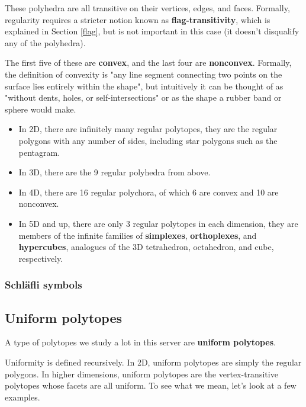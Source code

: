 \documentclass{article}
\begin{document}
These polyhedra are all transitive on their vertices, edges, and faces. Formally, regularity
requires a stricter notion known as \textbf{flag-transitivity}, which is explained in Section \ref{flag},
but is not important in this case (it doesn't disqualify any of the polyhedra).

The first five of these are \textbf{convex}, and the last four are \textbf{nonconvex}. Formally,
the definition of convexity is "any line segment connecting two points on the surface lies entirely
within the shape", but intuitively it can be thought of as "without dents, holes, or self-intersections"
or as the shape a rubber band or sphere would make.

\begin{itemize}
\item In 2D, there are infinitely many regular polytopes, they are the regular polygons with any number of
sides, including star polygons such as the pentagram.
\item In 3D, there are the 9 regular polyhedra from above.
\item In 4D, there are 16 regular polychora, of which 6 are convex and 10 are nonconvex.
\item In 5D and up, there are only 3 regular polytopes in each dimension, they are members of the
infinite families of \textbf{simplexes}, \textbf{orthoplexes}, and \textbf{hypercubes}, analogues of
the 3D tetrahedron, octahedron, and cube, respectively.
\end{itemize}

\subsubsection{Schläfli symbols}

\subsection{Uniform polytopes}
A type of polytopes we study a lot in this server are \textbf{uniform polytopes}.

Uniformity is defined recursively. In 2D, uniform polytopes are simply the regular polygons.
In higher dimensions, uniform polytopes are the vertex-transitive polytopes whose facets are all uniform. To see what we mean, let's look at a few examples.
\end{document}
